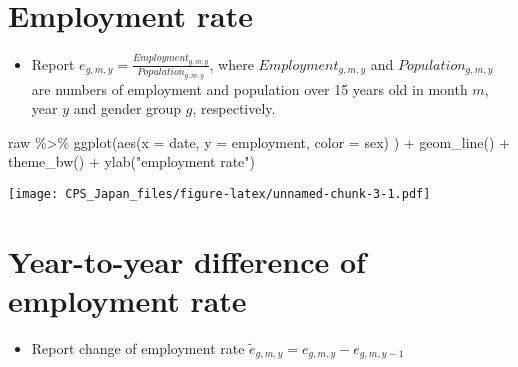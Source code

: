 \documentclass[
]{book}
\newenvironment{Shaded}{\begin{snugshade}}{\end{snugshade}}
\newcommand{\AttributeTok}[1]{\textcolor[rgb]{0.77,0.63,0.00}{#1}}
\newcommand{\FunctionTok}[1]{\textcolor[rgb]{0.00,0.00,0.00}{#1}}
\newcommand{\NormalTok}[1]{#1}
\newcommand{\SpecialCharTok}[1]{\textcolor[rgb]{0.00,0.00,0.00}{#1}}
\newcommand{\StringTok}[1]{\textcolor[rgb]{0.31,0.60,0.02}{#1}}
\providecommand{\tightlist}{%
  \setlength{\itemsep}{0pt}\setlength{\parskip}{0pt}}
\begin{document}
\hypertarget{employment-rate}{%
\section{Employment rate}\label{employment-rate}}

\begin{itemize}
\tightlist
\item
  Report \(e_{g,m,y} = \frac{Employment_{g,m,y}}{Population_{g,m,y}}\), where \(Employment_{g,m,y}\) and \(Population_{g,m,y}\) are numbers of employment and population over 15 years old in month \(m\), year \(y\) and gender group \(g\), respectively.
\end{itemize}

\begin{Shaded}
\begin{Highlighting}[]
\NormalTok{raw }\SpecialCharTok{\%\textgreater{}\%}
  \FunctionTok{ggplot}\NormalTok{(}\FunctionTok{aes}\NormalTok{(}\AttributeTok{x =}\NormalTok{ date,}
             \AttributeTok{y =}\NormalTok{ employment,}
             \AttributeTok{color =}\NormalTok{ sex)}
\NormalTok{         ) }\SpecialCharTok{+}
  \FunctionTok{geom\_line}\NormalTok{() }\SpecialCharTok{+}
  \FunctionTok{theme\_bw}\NormalTok{() }\SpecialCharTok{+}
  \FunctionTok{ylab}\NormalTok{(}\StringTok{"employment rate"}\NormalTok{)}
\end{Highlighting}
\end{Shaded}

\texttt{[image: CPS\_Japan\_files/figure-latex/unnamed-chunk-3-1.pdf]}

\hypertarget{year-to-year-difference-of-employment-rate}{%
\section{Year-to-year difference of employment rate}\label{year-to-year-difference-of-employment-rate}}

\begin{itemize}
\tightlist
\item
  Report change of employment rate \(\tilde e_{g,m,y}=e_{g,m,y}-e_{g,m,y-1}\)
\end{itemize}
\end{document}
